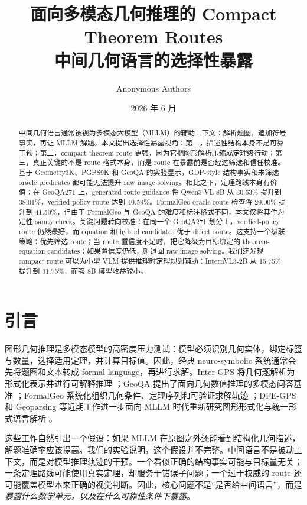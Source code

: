 \documentclass[UTF8,11pt,fontset=fandol]{ctexart}
\title{面向多模态几何推理的 Compact Theorem Routes\\
\large 中间几何语言的选择性暴露}
\author{Anonymous Authors}
\date{2026 年 6 月}
\begin{document}
\maketitle

\begin{abstract}
中间几何语言通常被视为多模态大模型（MLLM）的辅助上下文：解析题图，追加符号事实，再让 MLLM 解题。本文提出选择性暴露视角：第一，描述性结构本身不是可靠干预；第二，compact theorem route 更强，因为它把图形解析压缩成定理级行动；第三，真正关键的不是 route 格式本身，而是 route 在暴露前是否经过筛选和信任校准。基于 Geometry3K、PGPS9K 和 GeoQA 的实验显示，GDP-style 结构事实和未筛选 oracle predicates 都可能无法提升 raw image solving。相比之下，定理路线本身有价值：在 GeoQA271 上，generated route guidance 将 Qwen3-VL-8B 从 30.63\% 提升到 38.01\%，verified-policy route 达到 40.59\%。FormalGeo oracle-route 检查将 29.00\% 提升到 41.50\%，但由于 FormalGeo 与 GeoQA 的难度和标注格式不同，本文仅将其作为定性 sanity check。关键问题转向校准：在同一个 GeoQA271 划分上，verified-policy route 仍然最好，而 equation 和 hybrid candidates 优于 direct route。这支持一个级联策略：优先筛选 route；当 route 置信度不足时，把它降级为目标绑定的 theorem-equation candidates；如果置信度仍低，则退回 raw image solving。我们还发现 compact route 可以为小型 VLM 提供推理时定理规划辅助：InternVL3-2B 从 15.75\% 提升到 31.75\%，而强 8B 模型收益较小。
\end{abstract}

\section{引言}
图形几何推理是多模态模型的高密度压力测试：模型必须识别几何实体，绑定标签与数量，选择适用定理，并计算目标值。因此，经典 neuro-symbolic 系统通常会先将题图和文本转成 formal language，再进行求解。Inter-GPS 将几何题解析为形式化表示并进行可解释推理 \cite{lu2021intergps}；GeoQA 提出了面向几何数值推理的多模态问答基准 \cite{chen2021geoqa}；FormalGeo 系统化组织几何条件、定理序列和可验证求解轨迹 \cite{zhang2023formalgeo}；DFE-GPS 和 Geoparsing 等近期工作进一步面向 MLLM 时代重新研究图形形式化与统一形式语言解析 \cite{zhang2024dfegps,wang2026geoparsing}。

这些工作自然引出一个假设：如果 MLLM 在原图之外还能看到结构化几何描述，解题准确率应该提高。我们的实验说明，这个假设并不完整。中间语言不是被动上下文，而是对模型推理轨迹的干预。一个看似正确的结构事实可能与目标量无关；一条定理路线可能使用真实定理，却服务于错误子问题；一个过于权威的 route 还可能覆盖模型本来正确的视觉判断。因此，核心问题不是“是否给中间语言”，而是\emph{暴露什么数学单元，以及在什么可靠性条件下暴露}。
\end{document}
